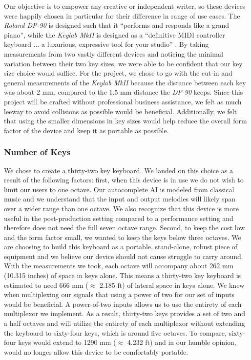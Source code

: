 Our objective is to empower any creative or independent writer, so these devices were happily chosen in particular for their difference in range of use cases. The \textit{Roland DP-90} is designed such that it “performs and responds like a grand piano”, while the \textit{Keylab MkII} is designed as a “definitive MIDI controller keyboard ... a luxurious, expressive tool for your studio” . By taking measurements from two vastly different devices and noticing the minimal variation between their two key sizes, we were able to be confident that our key size choice would suffice. For the project, we chose to go with the cut-in and general measurements of the \textit{Keylab MkII} because the distance between each key was about 2 mm, compared to the 1.5 mm distance the \textit{DP-90} keeps. Since this project will be crafted without professional business assistance, we felt as much leeway to avoid collisions as possible would be beneficial. Additionally, we felt that using the smaller dimensions in key sizes would help reduce the overall form factor of the device and keep it as portable as possible.

\subsubsection{Number of Keys}

We chose to create a thirty-two key keyboard. We landed on this choice as a result of the following factors: first, when this device is in use we do not wish to limit our users to one octave. Our autocomplete AI is modeled from classical music and we understand that the input and output melodies will likely span over a wider range than one octave. We also recognize that this device is more useful in the post-production setting compared to a performance setting and therefore does not need the full seven octave range. Second, to keep the cost low and the form factor small, we wanted to keep the keys below three octaves. We are choosing to build this keyboard as a portable, stand-alone, robust piece of equipment and we believe our device should not cause struggle to carry around. With the measurements we took, each octave will accompany about 262 mm (10.315 inches) of space in keys alone. This means a thirty-two key keyboard is estimated to need 666 mm ($ \approx $ 2.185 ft) of lateral space in keys alone. We knew when multiplexing our signals that using a power of two for our set of inputs would be beneficial. A power-of-two inputs allows us to use the entirety of each multiplexor we implement. As a result, thirty-two keys provides a set of two and a half octaves and will utilize the entirety of each multiplexor without extending the keyboard to sixty-four keys, which is around five octaves. To compare, sixty-four keys would extend to 1290 mm ($ \approx $ 4.232 ft) and in our humble opinion, would no longer allow this device to be comfortably portable.

